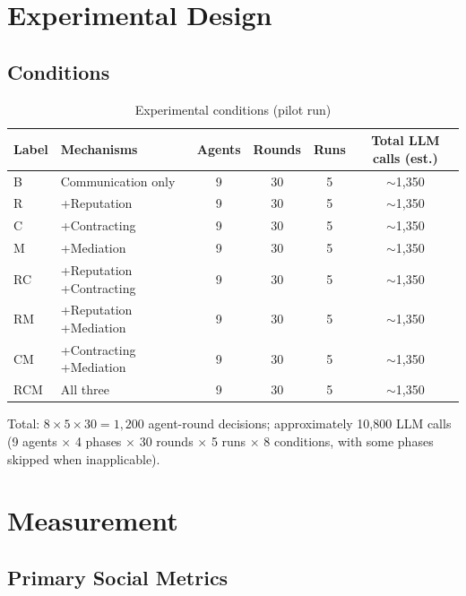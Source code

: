 \documentclass[12pt, a4paper]{article}
\begin{document}
\section{Experimental Design}
\label{sec:experiments}

\subsection{Conditions}

\begin{table}[H]
\centering
\caption{Experimental conditions (pilot run)}
\label{tab:conditions}
\begin{tabular}{@{}llcccc@{}}
\toprule
Label & Mechanisms & Agents & Rounds & Runs & Total LLM calls (est.) \\
\midrule
B   & Communication only               & 9 & 30 & 5 & $\sim$1,350 \\
R   & +Reputation                      & 9 & 30 & 5 & $\sim$1,350 \\
C   & +Contracting                     & 9 & 30 & 5 & $\sim$1,350 \\
M   & +Mediation                       & 9 & 30 & 5 & $\sim$1,350 \\
RC  & +Reputation +Contracting         & 9 & 30 & 5 & $\sim$1,350 \\
RM  & +Reputation +Mediation           & 9 & 30 & 5 & $\sim$1,350 \\
CM  & +Contracting +Mediation          & 9 & 30 & 5 & $\sim$1,350 \\
RCM & All three                        & 9 & 30 & 5 & $\sim$1,350 \\
\bottomrule
\end{tabular}
\end{table}

Total: $8 \times 5 \times 30 = 1{,}200$ agent-round decisions; approximately 10,800 LLM calls (9 agents $\times$ 4 phases $\times$ 30 rounds $\times$ 5 runs $\times$ 8 conditions, with some phases skipped when inapplicable).

\section{Measurement}
\label{sec:measurement}

\subsection{Primary Social Metrics}
\end{document}
